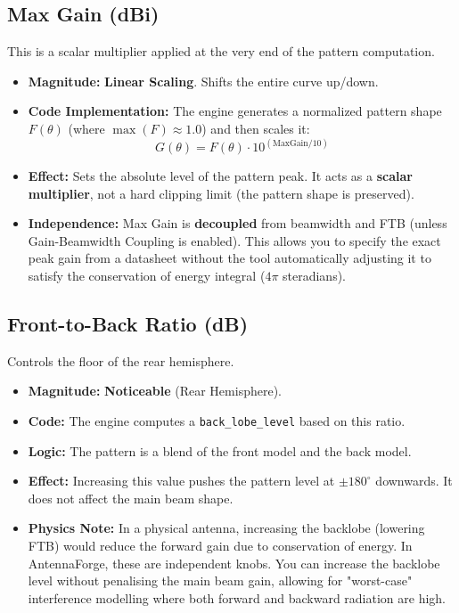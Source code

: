 \documentclass[11pt,a4paper]{article}
\begin{document}
\subsection{Max Gain (dBi)}
This is a scalar multiplier applied at the very end of the pattern computation.
\begin{itemize}
    \item \textbf{Magnitude:} \textbf{Linear Scaling}. Shifts the entire curve up/down.
    \item \textbf{Code Implementation:} The engine generates a normalized pattern shape $F(\theta)$ (where $\max(F) \approx 1.0$) and then scales it:
    \[ G(\theta) = F(\theta) \cdot 10^{(\text{MaxGain}/10)} \]
    \item \textbf{Effect:} Sets the absolute level of the pattern peak. It acts as a \textbf{scalar multiplier}, not a hard clipping limit (the pattern shape is preserved).
    \item \textbf{Independence:} Max Gain is \textbf{decoupled} from beamwidth and FTB (unless Gain-Beamwidth Coupling is enabled). This allows you to specify the exact peak gain from a datasheet without the tool automatically adjusting it to satisfy the conservation of energy integral ($4\pi$ steradians).
\end{itemize}

\subsection{Front-to-Back Ratio (dB)}
Controls the floor of the rear hemisphere.
\begin{itemize}
    \item \textbf{Magnitude:} \textbf{Noticeable} (Rear Hemisphere).
    \item \textbf{Code:} The engine computes a \texttt{back\_lobe\_level} based on this ratio.
    \item \textbf{Logic:} The pattern is a blend of the front model and the back model.
    \item \textbf{Effect:} Increasing this value pushes the pattern level at $\pm 180^\circ$ downwards. It does not affect the main beam shape.
    \item \textbf{Physics Note:} In a physical antenna, increasing the backlobe (lowering FTB) would reduce the forward gain due to conservation of energy. In AntennaForge, these are independent knobs. You can increase the backlobe level without penalising the main beam gain, allowing for "worst-case" interference modelling where both forward and backward radiation are high.
\end{itemize}
\end{document}
